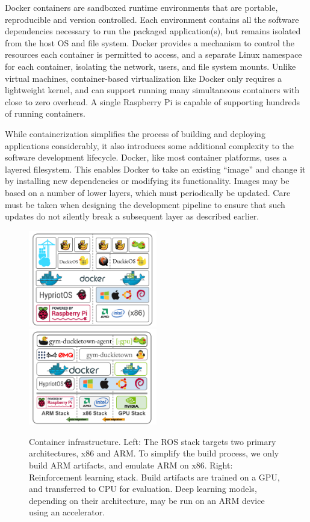 \documentclass[12pt,initial,twoside,maitrise]{dms}
\numberwithin{equation}{section}
\numberwithin{table}{chapter}
\numberwithin{figure}{chapter}
\begin{document}
Docker containers are sandboxed runtime environments that are portable, reproducible and version controlled. Each environment contains all the software dependencies necessary to run the packaged application(s), but remains isolated from the host OS and file system. Docker provides a mechanism to control the resources each container is permitted to access, and a separate Linux namespace for each container, isolating the network, users, and file system mounts. Unlike virtual machines, container-based virtualization like Docker only requires a lightweight kernel, and can support running many simultaneous containers with close to zero overhead. A single Raspberry Pi is capable of supporting hundreds of running containers.

While containerization simplifies the process of building and deploying applications considerably, it also introduces some additional complexity to the software development lifecycle. Docker, like most container platforms, uses a layered filesystem. This enables Docker to take an existing ``image'' and change it by installing new dependencies or modifying its functionality. Images may be based on a number of lower layers, which must periodically be updated. Care must be taken when designing the development pipeline to ensure that such updates do not silently break a subsequent layer as described earlier.

\begin{figure}[ht]
    \centering
    \includegraphics[width=0.50\textwidth]{docker_stack_1.png}
    \includegraphics[width=0.50\textwidth]{docker_stack_2.png}
    \caption{Container infrastructure. Left: The ROS stack targets two primary architectures, x86 and ARM. To simplify the build process, we only build ARM artifacts, and emulate ARM on x86. Right: Reinforcement learning stack. Build artifacts are trained on a GPU, and transferred to CPU for evaluation. Deep learning models, depending on their architecture, may be run on an ARM device using an accelerator.}
    \label{fig:docker}
\end{figure}
\end{document}
